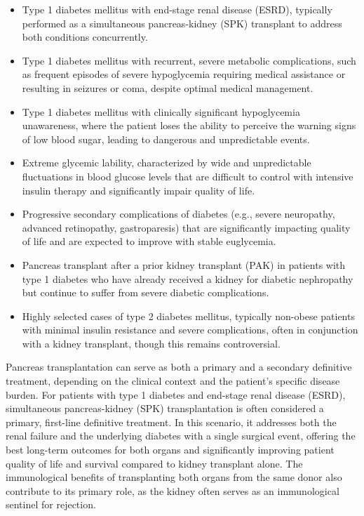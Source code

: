 \begin{itemize}
  \item Type 1 diabetes mellitus with end-stage renal disease (ESRD), typically performed as a simultaneous pancreas-kidney (SPK) transplant to address both conditions concurrently.
  \item Type 1 diabetes mellitus with recurrent, severe metabolic complications, such as frequent episodes of severe hypoglycemia requiring medical assistance or resulting in seizures or coma, despite optimal medical management.
  \item Type 1 diabetes mellitus with clinically significant hypoglycemia unawareness, where the patient loses the ability to perceive the warning signs of low blood sugar, leading to dangerous and unpredictable events.
  \item Extreme glycemic lability, characterized by wide and unpredictable fluctuations in blood glucose levels that are difficult to control with intensive insulin therapy and significantly impair quality of life.
  \item Progressive secondary complications of diabetes (e.g., severe neuropathy, advanced retinopathy, gastroparesis) that are significantly impacting quality of life and are expected to improve with stable euglycemia.
  \item Pancreas transplant after a prior kidney transplant (PAK) in patients with type 1 diabetes who have already received a kidney for diabetic nephropathy but continue to suffer from severe diabetic complications.
  \item Highly selected cases of type 2 diabetes mellitus, typically non-obese patients with minimal insulin resistance and severe complications, often in conjunction with a kidney transplant, though this remains controversial.
\end{itemize}

Pancreas transplantation can serve as both a primary and a secondary definitive treatment, depending on the clinical context and the patient's specific disease burden. For patients with type 1 diabetes and end-stage renal disease (ESRD), simultaneous pancreas-kidney (SPK) transplantation is often considered a primary, first-line definitive treatment. In this scenario, it addresses both the renal failure and the underlying diabetes with a single surgical event, offering the best long-term outcomes for both organs and significantly improving patient quality of life and survival compared to kidney transplant alone. The immunological benefits of transplanting both organs from the same donor also contribute to its primary role, as the kidney often serves as an immunological sentinel for rejection.

